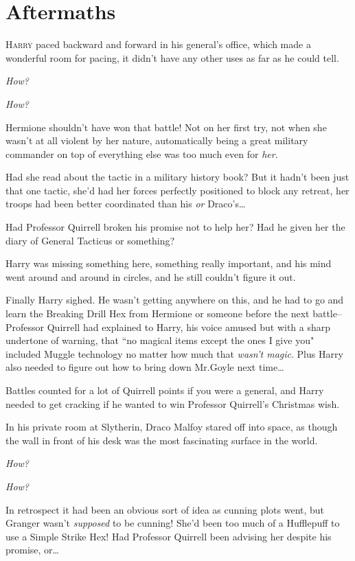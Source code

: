 
\section{Aftermaths}

\lettrine{H}{arry} paced backward and forward in his general's office, which made a wonderful room for pacing, it didn't have any other uses as far as he could tell.

\emph{How?}

\emph{How?}

Hermione shouldn't have won that battle! Not on her first try, not when she wasn't at all violent by her nature, automatically being a great military commander on top of everything else was too much even for \emph{her}.

Had she read about the tactic in a military history book? But it hadn't been just that one tactic, she'd had her forces perfectly positioned to block any retreat, her troops had been better coordinated than his \emph{or} Draco's{\ldots}

Had Professor Quirrell broken his promise not to help her? Had he given her the diary of General Tacticus or something?

Harry was missing something here, something really important, and his mind went around and around in circles, and he still couldn't figure it out.

Finally Harry sighed. He wasn't getting anywhere on this, and he had to go and learn the Breaking Drill Hex from Hermione or someone before the next battle\---Professor Quirrell had explained to Harry, his voice amused but with a sharp undertone of warning, that ``no magical items except the ones I give you" included Muggle technology no matter how much that \emph{wasn't magic}. Plus Harry also needed to figure out how to bring down Mr.\?Goyle next time{\ldots}

Battles counted for a lot of Quirrell points if you were a general, and Harry needed to get cracking if he wanted to win Professor Quirrell's Christmas wish.

\later

In his private room at Slytherin, Draco Malfoy stared off into space, as though the wall in front of his desk was the most fascinating surface in the world.

\emph{How?}

\emph{How?}

In retrospect it had been an obvious sort of idea as cunning plots went, but Granger wasn't \emph{supposed} to be cunning! She'd been too much of a Hufflepuff to use a Simple Strike Hex! Had Professor Quirrell been advising her despite his promise, or{\ldots}

